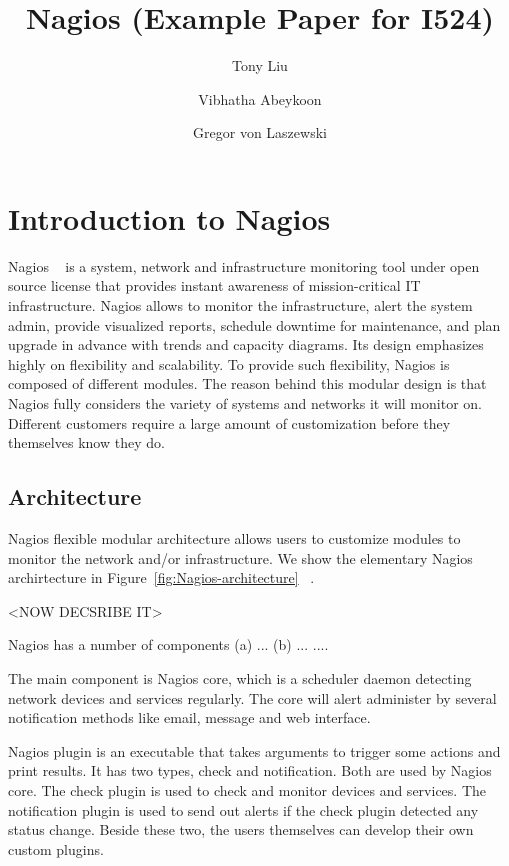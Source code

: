 \documentclass[9pt,twocolumn,twoside]{styles/osajnl}
\title{\centering%
Nagios (Example Paper for I524)}
\author[1]{Tony Liu}
\author[1]{Vibhatha Abeykoon}
\author[1]{Gregor von Laszewski}
\affil[1]{School of Informatics and Computing, Bloomington, IN 47408, U.S.A.}
\begin{document}
\maketitle

\section{Introduction to Nagios}

Nagios ~\cite{www-nagios, wiki-nagios} is a system, network and infrastructure monitoring tool under open source license that provides instant awareness of mission-critical IT infrastructure. Nagios allows to monitor the infrastructure, alert the system admin, provide visualized reports, schedule downtime for maintenance, and plan upgrade in advance with trends and capacity diagrams. Its design emphasizes highly on flexibility and scalability. To provide such flexibility, Nagios is composed of different modules. The reason behind this modular design is that Nagios fully considers the variety of systems and networks it will monitor on. Different customers require a large amount of customization before they themselves know they do.

\subsection{Architecture}

Nagios \cite{nagios-paper-2012} flexible modular architecture  allows users to customize modules to monitor the network and/or infrastructure.  We show the elementary Nagios archirtecture in Figure~\ref{fig:Nagios-architecture} ~\cite{nagios-book}.

<NOW DECSRIBE IT>


Nagios has a number of components (a) ... (b) ... ....

The main component is Nagios core, which is a scheduler daemon detecting network devices and services regularly. The core will alert administer by several notification methods like email, message and web interface. 

Nagios plugin is an executable that takes arguments to trigger some actions and print results. It has two types, check and notification. Both are used by Nagios core. The check plugin is used to check and monitor devices and services. The notification plugin is used to send out alerts if the check plugin detected any status change. Beside these two, the users themselves can develop their own custom plugins. 
\end{document}
